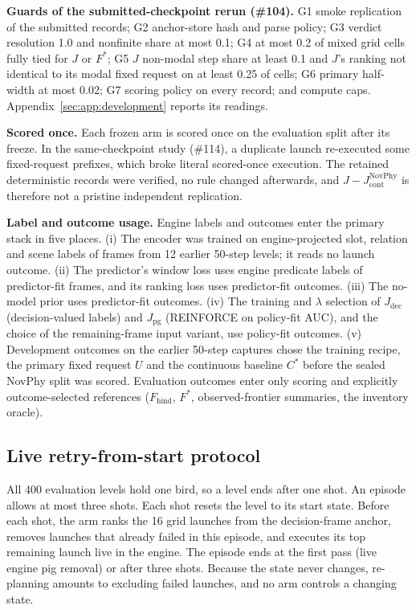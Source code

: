 \begin{revblock}
\textbf{Guards of the submitted-checkpoint rerun (\#104).} G1 smoke replication of the submitted records; G2 anchor-store hash and parse policy; G3 verdict resolution 1.0 and nonfinite share at most 0.1; G4 at most 0.2 of mixed grid cells fully tied for $J$ or $F^*$; G5 $J$ non-modal step share at least 0.1 and $J$'s ranking not identical to its modal fixed request on at least 0.25 of cells; G6 primary half-width at most 0.02; G7 scoring policy on every record; and compute caps. Appendix~\ref{sec:app:development} reports its readings.

\textbf{Scored once.} Each frozen arm is scored once on the evaluation split after its freeze. In the same-checkpoint study (\#114), a duplicate launch re-executed some fixed-request prefixes, which broke literal scored-once execution. The retained deterministic records were verified, no rule changed afterwards, and $J-J_{\mathrm{cont}}^{\mathrm{NovPhy}}$ is therefore not a pristine independent replication.

\textbf{Label and outcome usage.} Engine labels and outcomes enter the primary stack in five places. (i) The encoder was trained on engine-projected slot, relation and scene labels of frames from 12 earlier 50-step levels; it reads no launch outcome. (ii) The predictor's window loss uses engine predicate labels of predictor-fit frames, and its ranking loss uses predictor-fit outcomes. (iii) The no-model prior uses predictor-fit outcomes. (iv) The training and $\lambda$ selection of $J_{\mathrm{dec}}$ (decision-valued labels) and $J_{\mathrm{pg}}$ (REINFORCE on policy-fit AUC), and the choice of the remaining-frame input variant, use policy-fit outcomes. (v) Development outcomes on the earlier 50-step captures chose the training recipe, the primary fixed request $U$ and the continuous baseline $C^*$ before the sealed NovPhy split was scored. Evaluation outcomes enter only scoring and explicitly outcome-selected references ($F_{\mathrm{hind}}$, $F^*$, observed-frontier summaries, the inventory oracle).

\subsection{Live retry-from-start protocol}
\label{sec:app:proto:live}

All 400 evaluation levels hold one bird, so a level ends after one shot. An episode allows at most three shots. Each shot resets the level to its start state. Before each shot, the arm ranks the 16 grid launches from the decision-frame anchor, removes launches that already failed in this episode, and executes its top remaining launch live in the engine. The episode ends at the first pass (live engine pig removal) or after three shots. Because the state never changes, re-planning amounts to excluding failed launches, and no arm controls a changing state.


\end{revblock}
